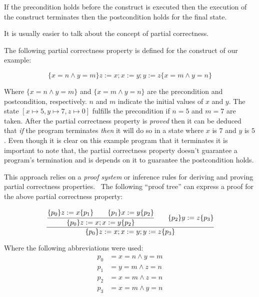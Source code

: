 \begin{displayquote}
If the precondition holds before the construct is executed then the execution of the construct terminates then the postcondition holds for the final state.
\end{displayquote}

It is usually easier to talk about the concept of partial correctness.~\parencite{nipkow}


The following partial correctness property is defined for the construct of our example:

\begin{equation*}
\lbrace x=n \land y=m \rbrace z:=x; x:=y; y:=z \lbrace x=m \land y=n \rbrace
\end{equation*}

Where $\lbrace x=n \land y=m \rbrace $ and $\lbrace x=m \land y=n \rbrace $ are the precondition and postcondition, respectively.
$n$ and $m$ indicate the initial values of $x$ and $y$.
The state $[x\mapsto5, y\mapsto7, z\mapsto0]$ fulfills the precondition if $n=5$ and $m=7$ are taken.
After the partial correctness property is \textit{proved} then it can be deduced that \textit{if} the program terminates \textit{then} it will do so in a state where $x$ is $7$ and $y$ is $5$.
Even though it is clear on this example program that it terminates it is important to note that, the partial correctness property doesn't guarantee a program's termination and is depends on it to guarantee the postcondition holds.

This approach relies on a \textit{proof system} or inference rules for deriving and proving partial correctness properties.~\parencite{nipkow}
The following ``proof tree'' can express a proof for the above partial correctness property:

\begin{equation*}
\cfrac{
  \cfrac{ \lbrace p_{0} \rbrace z:=x \lbrace p_{1} \rbrace \qquad \lbrace p_{1} \rbrace x:=y \lbrace p_{2} \rbrace }
    { \lbrace p_{0} \rbrace z:=x; x:=y \lbrace p_{2} \rbrace }
  \qquad
 \lbrace p_{2} \rbrace y:=z \lbrace p_{3} \rbrace
  }
  { \lbrace p_{0} \rbrace z:=x; x:=y; y:=z \lbrace p_{3} \rbrace }
\end{equation*}

Where the following abbreviations were used:
\begin{align*}
p_{0} &= x=n \land y=m\\
p_{1} &= y=m \land z=n\\
p_{2} &= x=m \land z=n\\
p_{3} &= x=m \land y=n
\end{align*}

